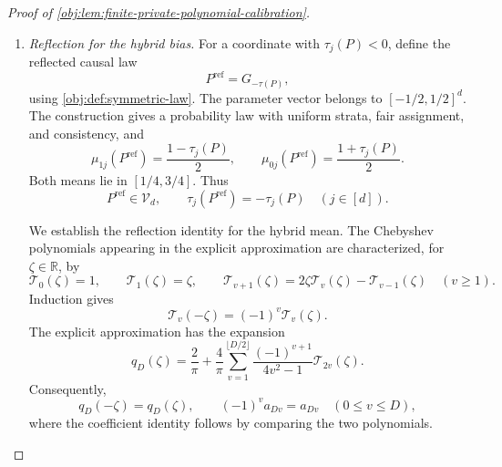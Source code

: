 \begin{proof}[Proof of \cref{obj:lem:finite-private-polynomial-calibration}]
\begin{enumerate}
For \(y_j\ge1\), the inequality \(\log y_j\le y_j-1\) and the nonnegativity of \((y_j-1)^2\) imply
\[
\log y_j\le\frac{y_j^2}{2}.
\]
For every nonnegative integer \(v\le L/1024\), it follows that
\[
3v+v\log y_j
\le\frac72v y_j^2
\le\frac7{2048}Ly_j^2
\le Ly_j^2,
\]
so
\[
e^{-8Ly_j^2}e^{3v}y_j^v\le e^{-7Ly_j^2}.
\]
Applying this with \(v=D\) proves
\[
h_j|p_{a,D}(\tau_j(P))|
\le a e^{-8Ly_j^2}e^{3D}y_j^D
\le a e^{-7Ly_j^2}.
\]
Since \(1,2\le L/1024\), the same bound with \(v=1,2\) gives
\[
h_jy_j^v
\le e^{-8Ly_j^2}y_j^v
\le e^{-8Ly_j^2}e^{3v}y_j^v
\le e^{-7Ly_j^2}
\qquad(v=1,2).
\]
Thus
\[
h_j\tau_j(P)\le a e^{-7Ly_j^2},
\qquad
h_j\tau_j(P)^2\le a^2e^{-7Ly_j^2}.
\]

The exponential lower bound \(e^{7L}\ge1+7L\ge L\) implies
\[
e^{-7Ly_j^2}\le e^{-7L}\le\frac1L,
\qquad
\frac aL=\frac{8\sigma}{\sqrt L}.
\]
Using the hybrid mean identity and the wrong-sign bound consequently gives
\[
\begin{aligned}
|\mathbb EH_j-\tau_j(P)|
&\le h_j|p_{a,D}(\tau_j(P))|
      +h_j\tau_j(P)+2\tau_j(P)w_j\\
&\le(8+8+2)\frac{\sigma}{\sqrt L}
\le20000\,\frac{\sigma}{\sqrt L}.
\end{aligned}
\]
Together with the inside case, this proves the bias bound for every nonnegative contrast, including zero and the boundary \(\tau_j(P)=a\).

\item \textit{Reflection for the hybrid bias.}
For a coordinate with \(\tau_j(P)<0\), define the reflected causal law
\[
P^{\mathrm{ref}}=G_{-\tau(P)},
\]
using \cref{obj:def:symmetric-law}. The parameter vector belongs to \([-1/2,1/2]^d\). The construction gives a probability law with uniform strata, fair assignment, and consistency, and
\[
\mu_{1j}(P^{\mathrm{ref}})=\frac{1-\tau_j(P)}2,
\qquad
\mu_{0j}(P^{\mathrm{ref}})=\frac{1+\tau_j(P)}2.
\]
Both means lie in \([1/4,3/4]\). Thus
\[
P^{\mathrm{ref}}\in\mathcal V_d,
\qquad
\tau_j(P^{\mathrm{ref}})=-\tau_j(P)
\quad(j\in[d]).
\]

We establish the reflection identity for the hybrid mean. The Chebyshev polynomials appearing in the explicit approximation are characterized, for \(\zeta\in\mathbb R\), by
\[
\mathcal T_0(\zeta)=1,
\qquad
\mathcal T_1(\zeta)=\zeta,
\qquad
\mathcal T_{v+1}(\zeta)
=2\zeta\mathcal T_v(\zeta)-\mathcal T_{v-1}(\zeta)
\quad(v\ge1).
\]
Induction gives
\[
\mathcal T_v(-\zeta)=(-1)^v\mathcal T_v(\zeta).
\]
The explicit approximation has the expansion
\[
q_D(\zeta)
=\frac2\pi+\frac4\pi
 \sum_{v=1}^{\lfloor D/2\rfloor}
 \frac{(-1)^{v+1}}{4v^2-1}\mathcal T_{2v}(\zeta).
\]
Consequently,
\[
q_D(-\zeta)=q_D(\zeta),
\qquad
(-1)^v a_{Dv}=a_{Dv}\quad(0\le v\le D),
\]
where the coefficient identity follows by comparing the two polynomials.


\end{enumerate}
\end{proof}
